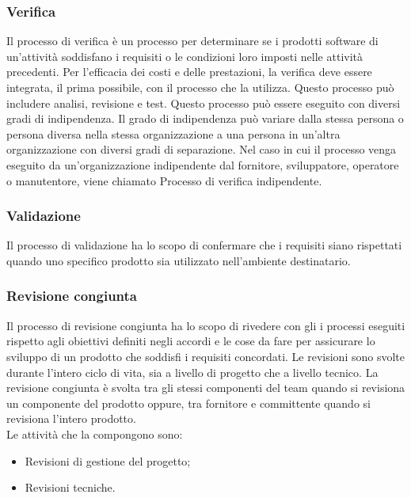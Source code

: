 \subsubsection{Verifica}
Il processo di verifica è un processo per determinare se i prodotti software di un'attività soddisfano i requisiti o le condizioni loro imposti nelle attività precedenti. Per l'efficacia dei costi e delle prestazioni, la verifica deve essere integrata, il prima possibile, con il processo che la utilizza. Questo processo può includere analisi, revisione e test. Questo processo può essere eseguito con diversi gradi di indipendenza. Il grado di indipendenza può variare dalla stessa persona o persona diversa nella stessa organizzazione a una persona in un'altra organizzazione con diversi gradi di separazione. Nel caso in cui il processo venga eseguito da un'organizzazione indipendente dal fornitore, sviluppatore, operatore o manutentore, viene chiamato Processo di verifica indipendente.

\subsubsection{Validazione}
Il processo di validazione ha lo scopo di confermare che i requisiti siano rispettati quando uno specifico prodotto sia utilizzato nell'ambiente destinatario.

\subsubsection{Revisione congiunta}
Il processo di revisione congiunta ha lo scopo di rivedere con gli  i processi eseguiti rispetto agli obiettivi definiti negli accordi e le cose da fare per assicurare lo sviluppo di un prodotto che soddisfi i requisiti concordati.
Le revisioni sono svolte durante l'intero ciclo di vita, sia a livello di progetto che a livello tecnico.
La revisione congiunta è svolta tra gli stessi componenti del team quando si revisiona un componente del prodotto oppure, tra fornitore e committente quando si revisiona l'intero prodotto. \\
Le attività che la compongono sono:
\begin{itemize}

	\item Revisioni di gestione del progetto;
	
	\item Revisioni tecniche.

\end{itemize}

